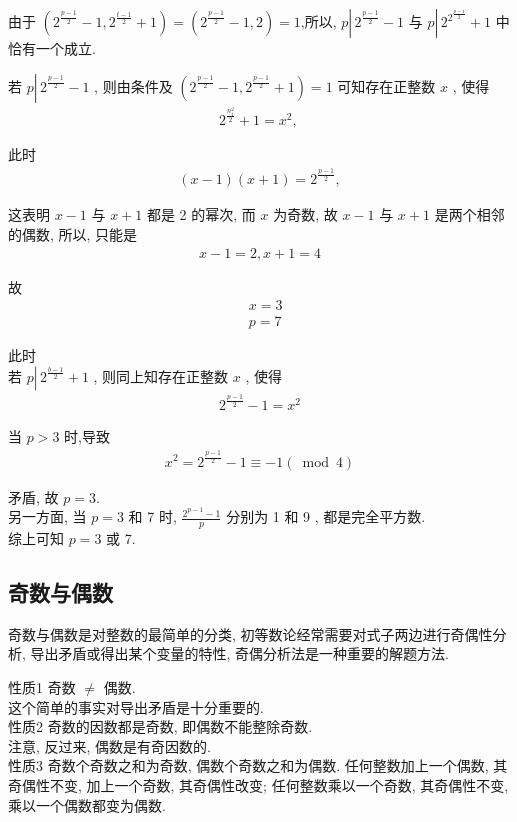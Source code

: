 	由于 $\left(2^{\frac{p-1}{2}}-1,2^{\frac{t-1}{2}}+1\right)=\left(2^{\frac{p-1}{2}}-1,2\right)=1$,所以,  $p \left\lvert\, 2^{\frac{p-1}{2}}-1\right.$ 与 $p \left\lvert\, 2^{2^{\frac{p-1}{2}}}+1\right.$ 中恰有一个成立.

	若 $p \left\lvert\, 2^{\frac{p-1}{2}}-1\right.$ , 则由条件及 $\left(2^{\frac{p-1}{2}}-1,2^{\frac{p-1}{2}}+1\right)=1$ 可知存在正整数 $x$ , 使得
	\begin{align*}
		2^{\frac{n_{1}^{2}}{2}}+1=x^{2} \text {, }
	\end{align*}

	此时
	\begin{align*}
		(x-1)(x+1)=2^{\frac{p-1}{2}},
	\end{align*}

	这表明 $x-1$ 与 $x+1$ 都是 2 的幂次, 而 $x$ 为奇数, 故 $x-1$ 与 $x+1$ 是两个相邻的偶数, 所以, 只能是
	\begin{align*}
		x-1=2, x+1=4
	\end{align*}

	故\begin{align}
		 & x=3 \\
		 & p=7
	\end{align}

	此时\\
	若 $p \left\lvert\, 2^{\frac{b-1}{2}}+1\right.$ , 则同上知存在正整数 $x$ , 使得
	\begin{align*}
		2^{\frac{p-1}{2}}-1=x^{2}
	\end{align*}

	当 $p>3$ 时,导致
	\begin{align*}
		x^{2}=2^{\frac{p-1}{2}}-1 \equiv-1(\bmod 4)
	\end{align*}

	矛盾, 故 $p=3$.\\
	另一方面, 当 $p=3$ 和 7 时,  $\frac{2^{p-1}-1}{p}$ 分别为 1 和 9 , 都是完全平方数.\\
	综上可知 $p=3$ 或 7.

	\subsection{奇数与偶数}
	奇数与偶数是对整数的最简单的分类, 初等数论经常需要对式子两边进行奇偶性分析, 导出矛盾或得出某个变量的特性, 奇偶分析法是一种重要的解题方法.

	性质1 奇数 $\neq$ 偶数. \\
	这个简单的事实对导出矛盾是十分重要的. \\
	性质2 奇数的因数都是奇数, 即偶数不能整除奇数. \\
	注意, 反过来, 偶数是有奇因数的. \\
	性质3 奇数个奇数之和为奇数, 偶数个奇数之和为偶数. 任何整数加上一个偶数, 其奇偶性不变, 加上一个奇数, 其奇偶性改变; 任何整数乘以一个奇数, 其奇偶性不变, 乘以一个偶数都变为偶数.

